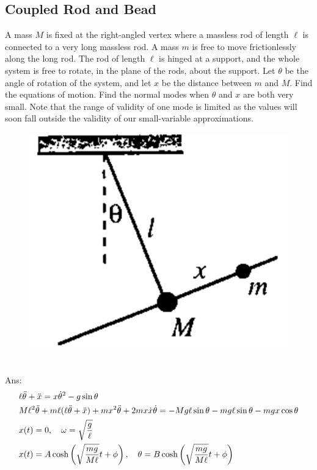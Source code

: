 \documentclass{article}
\begin{document}
\subsection{Coupled Rod and Bead}
A mass $M$ is fixed at the right-angled vertex where a massless rod of length $\ell$ is connected to a very long massless rod. A mass $m$ is free to move frictionlessly along the long rod. The rod of length $\ell$ is hinged at a support, and the whole system is free to rotate, in the plane of the rods, about the support. Let $\theta$ be the angle of rotation of the system, and let $x$ be the distance between $m$ and $M$. Find the equations of motion. Find the normal modes when $\theta$ and $x$ are both very small. Note that the range of validity of one mode is limited as the values will soon fall outside the validity of our small-variable approximations.
\begin{figure}[h]
    \centering
\includegraphics[width=0.4\linewidth]{images/rodandbead.png}
\end{figure}\\
Ans: 
\begin{align}
& \ell \ddot{\theta}+\ddot{x}=x \dot{\theta}^2-g \sin \theta\\
& M \ell^2 \ddot{\theta}+m \ell(\ell \ddot{\theta}+\ddot{x})+m x^2 \ddot{\theta}+2 m x \dot{x} \dot{\theta}=-M g \ell \sin \theta- m g \ell \sin \theta-m g x \cos \theta \notag \\
& x(t)=0, \quad \omega=\sqrt{\frac{g}{\ell}} \\ 
& x(t)=A \cosh \left(\sqrt{\frac{m g}{M \ell}} t+\phi\right), \quad \theta= B \cosh \left(\sqrt{\frac{m g}{M \ell}} t+\phi\right)
\end{align}
\end{document}
